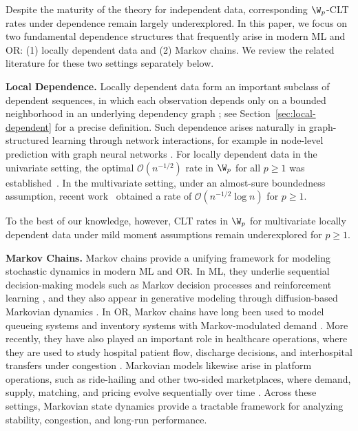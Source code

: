 \documentclass[mnsc,nonblindrev]{informs3}
\begin{document}
Despite the maturity of the theory for
independent data, corresponding \(\W_p\)-CLT rates under dependence remain largely underexplored. In this paper, we focus on two fundamental dependence
structures that frequently arise in modern ML and OR: (1) locally
dependent data and (2) Markov chains. We review the related literature for
these two settings separately below.

\noindent\textbf{Local Dependence.} Locally dependent data form an important subclass of dependent sequences, in which each
observation depends only on a bounded neighborhood in an underlying dependency graph
\citep{rinott1994normal}; see Section~\ref{sec:local-dependent} for a precise definition.
Such dependence arises naturally in graph-structured learning through network interactions,
for example in node-level prediction with graph neural networks
\citep{kipf2016semi,hamilton2017inductive}. For locally dependent data in the univariate setting, the optimal $\mathcal{O}(n^{-1/2})$
rate in $\W_p$ for all $p\ge 1$ was established~\citep{liu2023wasserstein}.
 In the multivariate setting, under an almost-sure boundedness assumption, recent work~\citep{fang2023p} obtained a rate of
$\mathcal{O}(n^{-1/2}\log n)$ for $p\ge 1$.


To the best of our knowledge, however, CLT rates in $\W_p$ for multivariate locally dependent data under mild moment assumptions remain underexplored for $p\ge 1$.

\noindent\textbf{Markov Chains.} Markov chains provide a unifying framework for modeling stochastic dynamics in
modern ML and OR. In ML, they
underlie sequential decision-making models such as Markov decision processes and
reinforcement learning
\citep{puterman2014markov,sutton1998reinforcement,zhang2024constant}, and they
also appear in generative modeling through diffusion-based Markovian dynamics
\citep{ho2020denoising}. In OR, Markov chains have long been used to model queueing systems
\citep{asmussen2003applied} and inventory systems with Markov-modulated demand
\citep{song1993inventory}. More recently, they have also played an important
role in healthcare operations, where they are used to study hospital patient
flow, discharge decisions, and interhospital transfers under congestion
\citep{shi2021timing,chan2026optimizing}. Markovian models likewise arise in
platform operations, such as ride-hailing and other two-sided marketplaces,
where demand, supply, matching, and pricing evolve sequentially over time
\citep{varma2023dynamic,ben2025data}. Across these settings, Markovian state
dynamics provide a tractable framework for analyzing stability, congestion, and
long-run performance.
\end{document}
